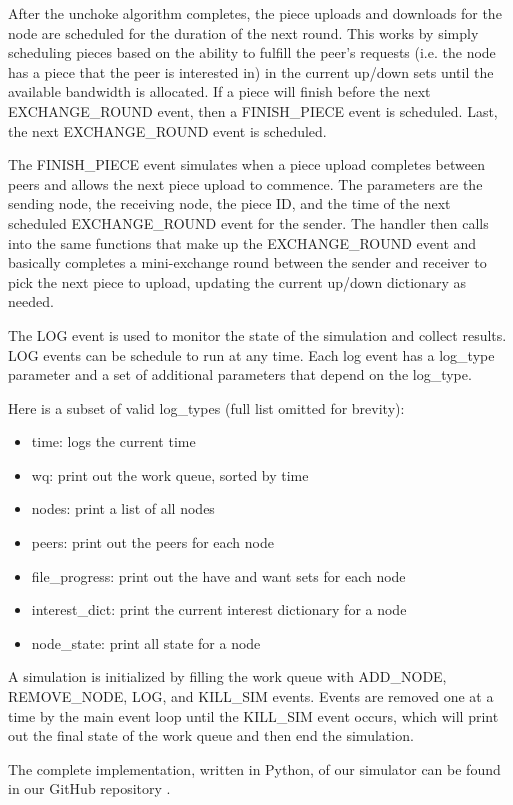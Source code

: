 After the unchoke algorithm completes, the piece uploads and downloads for the node are scheduled for the
duration of the next round. This works by simply scheduling pieces based on the ability to fulfill the peer's
requests (i.e. the node has a piece that the peer is interested in) in the current up/down sets until
the available bandwidth is allocated. If a piece will finish before the next EXCHANGE\_ROUND event, then
a FINISH\_PIECE event is scheduled. Last, the next EXCHANGE\_ROUND event is scheduled.

The FINISH\_PIECE event simulates when a piece upload completes between peers and allows the next piece
upload to commence. The parameters are the sending node, the receiving node, the piece ID, and 
the time of the next scheduled EXCHANGE\_ROUND event for the sender. The handler then calls into the same
functions that make up the EXCHANGE\_ROUND event and basically completes a mini-exchange round between
the sender and receiver to pick the next piece to upload, updating the current up/down dictionary as needed.

The LOG event is used to monitor the state of the simulation and collect results. LOG events can be schedule to run at any time.
Each log event has a log\_type parameter and a set of additional parameters that depend on the log\_type. 

Here is a subset of valid log\_types (full list omitted for brevity):

\begin{itemize}
\item time: logs the current time
\item wq: print out the work queue, sorted by time
\item nodes: print a list of all nodes
\item peers: print out the peers for each node
\item file\_progress: print out the have and want sets for each node
\item interest\_dict: print the current interest dictionary for a node
\item node\_state: print all state for a node
\end{itemize}


A simulation is initialized by filling the work queue with ADD\_NODE, REMOVE\_NODE, LOG, and KILL\_SIM events.
Events are removed one at a time by the main event loop until the KILL\_SIM event occurs, which will print out the 
final state of the work queue and then end the simulation.

The complete implementation, written in Python, of our simulator can be found in our GitHub repository \cite{github}.
